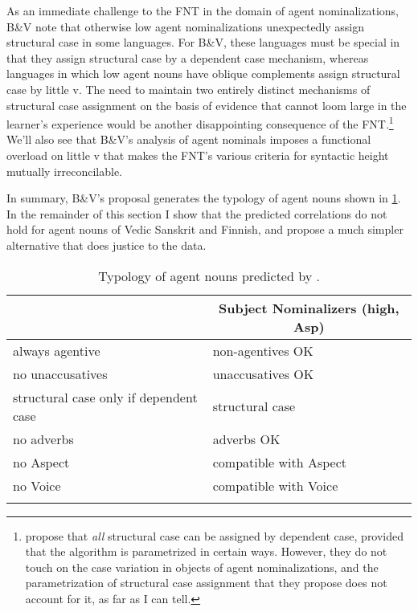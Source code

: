 \documentclass[output=paper,
modfonts
]{LSP/langsci}
\begin{document}
As an immediate challenge to the FNT in the domain of agent nominalizations, B\&V note that
otherwise low agent nominalizations unexpectedly assign structural case in some languages.
For B\&V, these languages must be special in that they assign structural case by a
dependent case mechanism, whereas languages in which low agent nouns have oblique complements
assign structural case by little v.  The need to maintain two entirely distinct mechanisms of
structural case assignment on the basis of evidence that cannot loom large in the learner's experience would
be another disappointing consequence of the FNT.\footnote{\citet{levin2015} propose that
  \textit{all} structural case can be assigned by dependent case, provided  that the
  algorithm is parametrized in certain ways.  However, they do not touch on the case variation
  in objects of agent nominalizations, and the parametrization of structural case assignment
  that they propose does not account for it, as far as I can tell.} We'll also see that B\&V's
analysis of agent nominals imposes a functional overload on little v that makes the FNT's
various criteria for syntactic height mutually irreconcilable.

In summary, B\&V's proposal generates the typology of agent nouns shown in \cref{tab:agnouns}. In the remainder of this section I show that the predicted correlations do not hold for agent
nouns of Vedic Sanskrit and Finnish, and propose a much simpler alternative that does justice
to the data.

\begin{table}
  \begin{tabular}[t]{ll}
  \lsptoprule
  \multicolumn{1}{c}{Agent Nominalizers (low, v)}	  & \multicolumn{1}{c}{Subject Nominalizers (high, Asp)}\\
  \midrule
  always agentive			  &non-agentives OK	     \\
  no unaccusatives			  &unaccusatives OK	    \\
  structural case only if dependent case  &structural case	     \\
  no adverbs				  &adverbs OK			       \\
  no   Aspect				  &compatible with Aspect		       \\
  no Voice & compatible with Voice\\
  \lspbottomrule
\end{tabular}
\caption{Typology of agent nouns predicted by \citet{baker2009}.}
\label{tab:agnouns}
\end{table}
\end{document}
